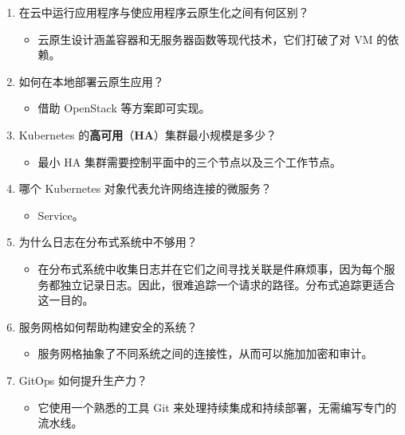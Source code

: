 \begin{enumerate}
\item 在云中运行应用程序与使应用程序云原生化之间有何区别？

\begin{itemize}
\item 云原生设计涵盖容器和无服务器函数等现代技术，它们打破了对 VM 的依赖。
\end{itemize}
\item 如何在本地部署云原生应用？

\begin{itemize}
\item 借助 OpenStack 等方案即可实现。
\end{itemize}
\item Kubernetes 的\textbf{高可用}（\textbf{HA}）集群最小规模是多少？

\begin{itemize}
\item 最小 HA 集群需要控制平面中的三个节点以及三个工作节点。
\end{itemize}
\item 哪个 Kubernetes 对象代表允许网络连接的微服务？

\begin{itemize}
\item Service。
\end{itemize}
\item 为什么日志在分布式系统中不够用？

\begin{itemize}
\item 在分布式系统中收集日志并在它们之间寻找关联是件麻烦事，因为每个服务都独立记录日志。因此，很难追踪一个请求的路径。分布式追踪更适合这一目的。
\end{itemize}
\item 服务网格如何帮助构建安全的系统？

\begin{itemize}
\item 服务网格抽象了不同系统之间的连接性，从而可以施加加密和审计。
\end{itemize}
\item GitOps 如何提升生产力？

\begin{itemize}
\item 它使用一个熟悉的工具 Git 来处理持续集成和持续部署，无需编写专门的流水线。
\end{itemize}
\end{enumerate}
